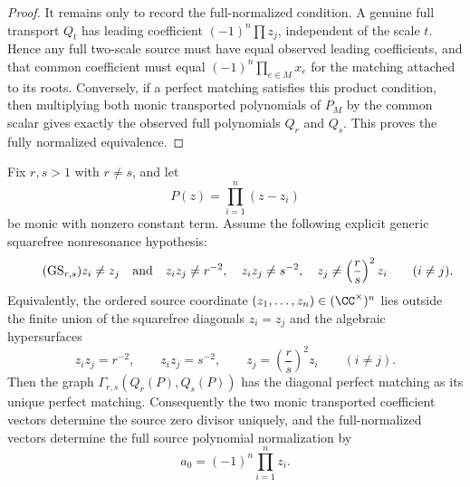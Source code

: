 \begin{proof}
It remains only to record the full-normalized condition.  A genuine
full transport \(Q_t\) has leading coefficient
\((-1)^n\prod z_j\), independent of the scale \(t\).  Hence any full
two-scale source must have equal observed leading coefficients, and
that common coefficient must equal
\((-1)^n\prod_{e\in M}x_e\) for the matching attached to its roots.
Conversely, if a perfect matching satisfies this product condition,
then multiplying both monic transported polynomials of \(P_M\) by the
common scalar gives exactly the observed full polynomials \(Q_r\) and
\(Q_s\).  This proves the fully normalized equivalence.
\end{proof}

\begin{corollary}\label{cor:generic-two-scale-injectivity}
Fix \(r,s>1\) with \(r\ne s\), and let
\[
P(z)=\prod_{i=1}^{n}(z-z_i)
\]
be monic with nonzero constant term.  Assume the following explicit
generic squarefree nonresonance hypothesis:
\[
\tag{\(\mathrm{GS}_{r,s}\)}
z_i\ne z_j
\quad\text{and}\quad
z_i z_j\ne r^{-2},\quad
z_i z_j\ne s^{-2},\quad
z_j\ne \left(\frac r s\right)^2 z_i
\qquad (i\ne j).
\]
Equivalently, the ordered source coordinate
\((z_1,\dots,z_n)\in(\CC^\times)^n\) lies outside the finite union of
the squarefree diagonals \(z_i=z_j\) and the algebraic hypersurfaces
\[
z_i z_j=r^{-2},
\qquad
z_i z_j=s^{-2},
\qquad
z_j=\left(\frac r s\right)^2 z_i
\qquad (i\ne j).
\]
Then the graph
\(\Gamma_{r,s}(Q_r(P),Q_s(P))\) has the diagonal perfect matching as
its unique perfect matching.  Consequently the two monic transported
coefficient vectors determine the source zero divisor uniquely, and
the full-normalized vectors determine the full source polynomial
normalization by
\[
a_0=(-1)^n\prod_{i=1}^{n}z_i .
\]
\end{corollary}

